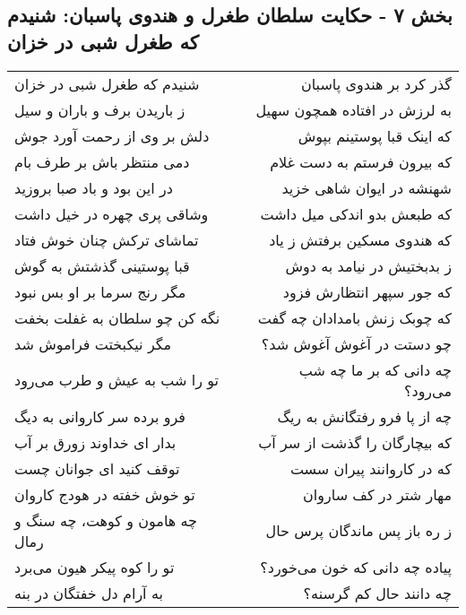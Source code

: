 \begin{center}
\section*{بخش ۷ - حکایت سلطان طغرل و هندوی پاسبان: شنیدم که طغرل شبی در خزان}
\label{sec:007}
\begin{longtable}{l p{0.5cm} r}
شنیدم که طغرل شبی در خزان
&&
گذر کرد بر هندوی پاسبان
\\
ز باریدن برف و باران و سیل
&&
به لرزش در افتاده همچون سهیل
\\
دلش بر وی از رحمت آورد جوش
&&
که اینک قبا پوستینم بپوش
\\
دمی منتظر باش بر طرف بام
&&
که بیرون فرستم به دست غلام
\\
در این بود و باد صبا بروزید
&&
شهنشه در ایوان شاهی خزید
\\
وشاقی پری چهره در خیل داشت
&&
که طبعش بدو اندکی میل داشت
\\
تماشای ترکش چنان خوش فتاد
&&
که هندوی مسکین برفتش ز یاد
\\
قبا پوستینی گذشتش به گوش
&&
ز بدبختیش در نیامد به دوش
\\
مگر رنج سرما بر او بس نبود
&&
که جور سپهر انتظارش فزود
\\
نگه کن چو سلطان به غفلت بخفت
&&
که چوبک زنش بامدادان چه گفت
\\
مگر نیکبختت فراموش شد
&&
چو دستت در آغوش آغوش شد؟
\\
تو را شب به عیش و طرب می‌رود
&&
چه دانی که بر ما چه شب می‌رود؟
\\
فرو برده سر کاروانی به دیگ
&&
چه از پا فرو رفتگانش به ریگ
\\
بدار ای خداوند زورق بر آب
&&
که بیچارگان را گذشت از سر آب
\\
توقف کنید ای جوانان چست
&&
که در کاروانند پیران سست
\\
تو خوش خفته در هودج کاروان
&&
مهار شتر در کف ساروان
\\
چه هامون و کوهت، چه سنگ و رمال
&&
ز ره باز پس ماندگان پرس حال
\\
تو را کوه پیکر هیون می‌برد
&&
پیاده چه دانی که خون می‌خورد؟
\\
به آرام دل خفتگان در بنه
&&
چه دانند حال کم گرسنه؟
\\
\end{longtable}
\end{center}
